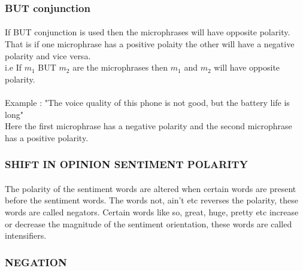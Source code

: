 \subsubsection{BUT conjunction}
\paragraph{} If BUT conjunction is used then the microphrases will have opposite polarity. That is if one microphrase has a positive polaity the other will have a negative polarity and vice versa.
\\
i.e If $ m_1 $ BUT $ m_2 $ are the microphrases then $ m_1 $ and $ m_2 $ will have opposite polarity.
\\ \\
Example : "The voice quality of this phone is not good, but the  battery life is long"
\\
Here the first microphrase has a negative polarity and the second microphrase has a positive polarity.

\subsubsection{SHIFT IN OPINION SENTIMENT POLARITY}
\paragraph{}The polarity of the sentiment words are altered when certain words are  present before the sentiment words. The words not, ain't etc reverses the polarity, these words are called negators. Certain words like so, great, huge, pretty etc increase or decrease the magnitude of the sentiment orientation, these words are called intensifiers. 
\subsubsection{NEGATION}
